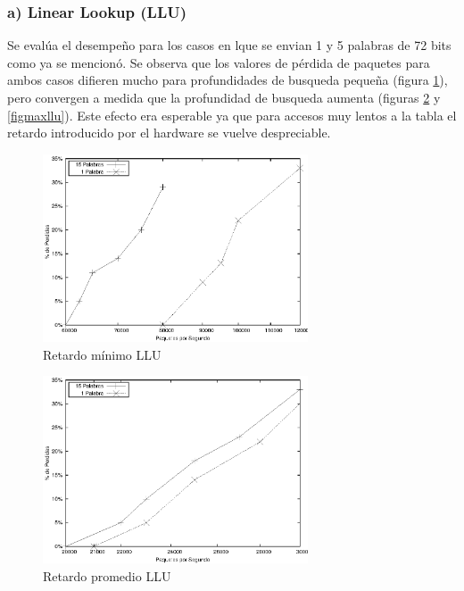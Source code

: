 \subsubsection{a) Linear Lookup (LLU)}
Se evalúa el desempeño para los casos en lque se envian 1 y 5 palabras de 72 bits como ya se mencionó. Se observa que los valores de pérdida de paquetes para ambos casos difieren mucho para profundidades de busqueda pequeña (figura \ref{figminllu}), pero convergen a medida que la profundidad de busqueda aumenta (figuras \ref{figpromllu} y \ref{figmaxllu}). Este efecto era esperable ya que para accesos muy lentos a la tabla el retardo introducido por el hardware se vuelve despreciable.



\newpage
\begin{figure}[!h]
  \centering
	\includegraphics[width=0.7\textwidth]{5-resultados/graf/llumin.eps}
  \caption{Retardo mínimo LLU}
  \label{figminllu}
\end{figure}
\begin{figure}[!h]
  \centering
	\includegraphics[width=0.7\textwidth]{5-resultados/graf/lluprom.eps}
  \caption{Retardo promedio LLU}
  \label{figpromllu}
\newpage
\end{figure}
